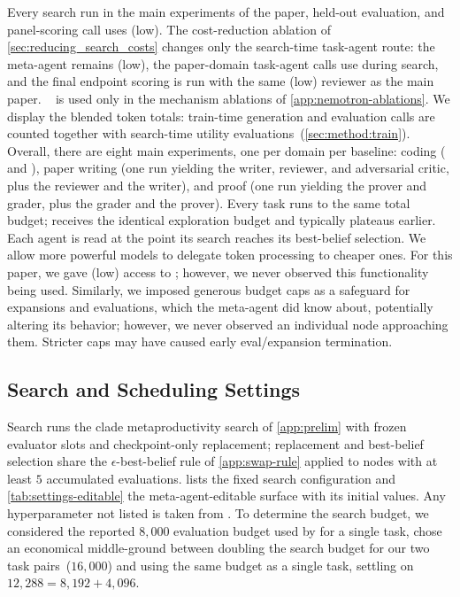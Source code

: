 Every search run in the main experiments of the paper, held-out evaluation, and panel-scoring call uses \gptlow (low). The cost-reduction ablation of \cref{sec:reducing_search_costs} changes only the search-time task-agent route: the meta-agent remains \gptlow (low), the paper-domain task-agent calls use \nemotronultra during search, and the final endpoint scoring is run with the same \gptlow (low) reviewer as the main paper. \nemotron~\citep{nemotron_super} is used only in the mechanism ablations of \cref{app:nemotron-ablations}. We display the blended token totals: train-time generation and evaluation calls are counted together with search-time utility evaluations~(\cref{sec:method:train}). Overall, there are eight main experiments, one per domain per baseline: coding (\ourmethod{} and \hgmh), paper writing (one \ourmethod{} run yielding the writer, reviewer, and adversarial critic, plus the \hgmh reviewer and the \hgmh writer), and proof (one \ourmethod{} run yielding the prover and grader, plus the \hgmh grader and the \hgmh prover). Every task runs to the same total budget; \hgmh receives the identical exploration budget and typically plateaus earlier. Each agent is read at the point its search reaches its best-belief selection. We allow more powerful models to delegate token processing to cheaper ones. For this paper, we gave \gptlow (low) access to \nemotron; however, we never observed this functionality being used. Similarly, we imposed generous budget caps as a safeguard for expansions and evaluations, which the meta-agent did know about, potentially altering its behavior; however, we never observed an individual node approaching them. Stricter caps may have caused early eval/expansion termination.

\subsection{Search and Scheduling Settings}
\label{app:hyperparams}

Search runs the \hgm clade metaproductivity search of \cref{app:prelim} with frozen evaluator slots and checkpoint-only replacement; replacement and best-belief selection share the $\epsilon$-best-belief rule of \cref{app:swap-rule} applied to nodes with at least $5$ accumulated evaluations.  lists the fixed search configuration and \cref{tab:settings-editable} the meta-agent-editable surface with its initial values. Any hyperparameter not listed is taken from \citet{wang2025huxley}. To determine the search budget, we considered the reported $8{,}000$ evaluation budget used by \citet{wang2025huxley} for a single task, chose an economical middle-ground between doubling the search budget for our two task pairs~($16{,}000$) and using the same budget as a single task, settling on $12{,}288 = 8{,}192 + 4{,}096$. 

